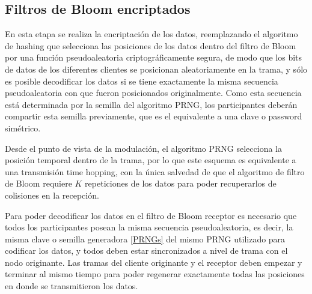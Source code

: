 
\subsection{Filtros de Bloom encriptados}

En esta etapa se realiza la encriptación de los datos, reemplazando el algoritmo de hashing que selecciona las posiciones de los datos dentro del filtro de Bloom por una función pseudoaleatoria criptográficamente segura, de modo que los bits de datos de los diferentes clientes se posicionan aleatoriamente en la trama, y sólo es posible decodificar los datos si se tiene exactamente la misma secuencia pseudoaleatoria con que fueron posicionados originalmente. Como esta secuencia está determinada por la semilla del algoritmo PRNG, los participantes deberán compartir esta semilla previamente, que es el equivalente a una clave o password simétrico. 

Desde el punto de vista de la modulación, el algoritmo PRNG selecciona la posición temporal dentro de la trama, por lo que este esquema es equivalente a una transmisión time hopping, con la única salvedad de que el algoritmo de filtro de Bloom requiere $K$ repeticiones de los datos para poder recuperarlos de colisiones en la recepción.

Para poder decodificar los datos en el filtro de Bloom receptor es necesario que todos los participantes posean la misma secuencia pseudoaleatoria, es decir, la misma clave o semilla generadora \ref{PRNGs} del mismo PRNG utilizado para codificar los datos, y todos deben estar sincronizados a nivel de trama con el nodo originante. Las tramas del cliente originante y el receptor deben empezar y terminar al mismo tiempo para poder regenerar exactamente todas las posiciones en donde se transmitieron los datos. 

